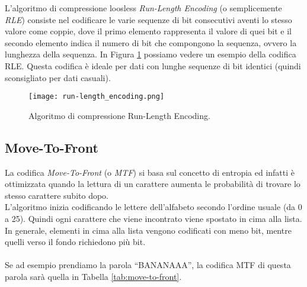 			L'algoritmo di compressione loosless \textit{Run-Length Encoding} (o semplicemente \textit{RLE}) consiste nel codificare le varie sequenze di bit consecutivi aventi lo stesso valore come coppie, dove il primo elemento rappresenta il valore di quei bit e il secondo elemento indica il numero di bit che compongono la sequenza, ovvero la lunghezza della sequenza. In Figura \ref{fig:run-length_encoding} possiamo vedere un esempio della codifica RLE. Questa codifica è ideale per dati con lunghe sequenze di bit identici (quindi sconsigliato per dati casuali).
			
			\begin{figure}[h!]
				\centering
					\texttt{[image: run-length\_encoding.png]}
				\caption{Algoritmo di compressione Run-Length Encoding.}
				\label{fig:run-length_encoding}
			\end{figure}
			
		\subsection{Move-To-Front} \label{subsec:move-to-front}
			
			La codifica \textit{Move-To-Front} (o \textit{MTF}) si basa sul concetto di entropia ed infatti è ottimizzata quando la lettura di un carattere aumenta le probabilità di trovare lo stesso carattere subito dopo.\\
			L'algoritmo inizia codificando le lettere dell'alfabeto secondo l'ordine usuale (da 0 a 25). Quindi ogni carattere che viene incontrato viene spostato in cima alla lista. In generale, elementi in cima alla lista vengono codificati con meno bit, mentre quelli verso il fondo richiedono più bit.\\
			\\
			Se ad esempio prendiamo la parola ``BANANAAA'', la codifica MTF di questa parola sarà quella in Tabella \ref{tab:move-to-front}.
			
